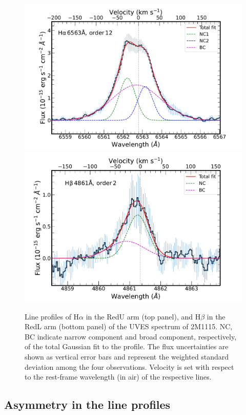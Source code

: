 \documentclass{aa}
\newcommand{\Ha}{\ensuremath{\mathrm{H}\alpha}\xspace}
\newcommand{\Hb}{\ensuremath{\mathrm{H}\beta}\xspace}
\begin{document}
\begin{figure}[ht]
\centering
\includegraphics[width=1.0\linewidth, trim = {1cm 0cm 2cm 0.5cm}, clip]{Halpha.pdf} \\
\includegraphics[width=1.0\linewidth, trim = {1cm 0cm 2cm 0.5cm}, clip]{Hbeta.pdf}
\caption{Line profiles of \Ha in the RedU arm (top panel), and \Hb in the RedL arm (bottom panel) of the UVES spectrum of 2M1115. NC, BC indicate narrow component and broad component, respectively, of the total Gaussian fit to the profile. The flux uncertainties are shown as vertical error bars and represent the weighted standard deviation among the four observations. Velocity is set with respect to the rest-frame wavelength (in air) of the respective lines.}
\label{fig1}
\end{figure}

\subsection{Asymmetry in the line profiles} \label{assymetry}
\end{document}
